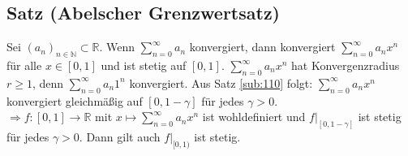 \subsection[Abelscher Grenzwertsatz]{Satz (Abelscher Grenzwertsatz)} %
\label{sub:112}
Sei $(a_n)_{n \in \mathds{N}} \subset \mathds{R}$. Wenn $\sum_{n=0}^{\infty} a_n $ konvergiert, dann konvergiert $\sum_{n=0}^{\infty} a_n x^n$ für alle $x \in [0,1]$
und ist stetig auf $[0,1]$.
$\sum_{n=0}^{\infty} a_n x^n $ hat Konvergenzradius $r\ge 1$, denn $\sum_{n=0}^{\infty} a_n 1^n$ konvergiert. Aus Satz \ref{sub:110} folgt: $\sum_{n=0}^{\infty} a_n x^n$
konvergiert gleichmäßig auf $[0,1-\gamma]$ für jedes $\gamma >0$. \\
$\Longrightarrow f : [0,1] \to \mathds{R}$ mit $x \mapsto \sum_{n=0}^{\infty} a_n x^n$ ist wohldefiniert und $f|_{[0, 1-\gamma]}$ ist stetig für jedes $\gamma >0$.
Dann gilt auch $f|_{[0,1)}$ ist stetig.

